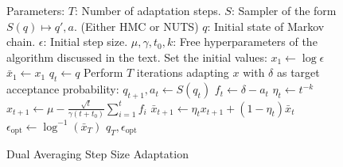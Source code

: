 \begin{figure}[H]
	\begin{algorithm}[H]
	\caption{Dual Averaging Step Size Adaptation}\label{algo:dual_step_size_adaptation}
	\begin{algorithmic}
        \State Parameters:
        \State $T$: Number of adaptation steps.
        \State $S$: Sampler of the form $S(q) \mapsto q', a$. (Either HMC or NUTS)
        \State $q$: Initial state of Markov chain.
        \State $\epsilon$: Initial step size.
        \State $\mu, \gamma, t_0, k$: Free hyperparameters of the algorithm discussed in the text. 
            \State Set the initial values:
            \State $x_1 \gets \log \epsilon$
            \State $\bar{x}_1 \gets x_1$
            \State $q_t \gets q$
            \State Perform $T$ iterations adapting $x$ with $\delta$ as target acceptance probability:
                \State $q_{t+1}, a_t \gets S(q_t)$ 
                \State $f_t \gets \delta - a_t$ 
                \State $\eta_t \gets t^{-k}$ 
                \State $x_{t+1} \gets \mu - \frac{\sqrt{t}}{\gamma(t + t_0)}\sum_{i=1}^t f_i$ 
                \State $\bar{x}_{t+1} \gets \eta_t x_{t+1} + (1 - \eta_t)\bar{x}_t$ 
            \EndFor
            \State $\epsilon_\text{opt} \gets \log^{-1}(\bar{x}_T)$ 
            \State \Return $q_T, \epsilon_\text{opt}$ 
        \EndFunction
	\end{algorithmic}
	\end{algorithm}
\end{figure}
